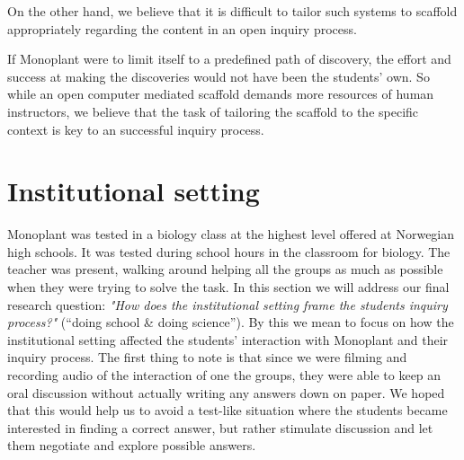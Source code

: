 On the other hand, we believe that it is difficult to tailor such systems to scaffold appropriately regarding the content in an open inquiry process.

 If Monoplant were to limit itself to a predefined path of discovery, the effort and success at making the discoveries would not have been the students' own. So while an open computer mediated scaffold demands more resources of human instructors, we believe that the task of tailoring the scaffold to the specific context is key to an successful inquiry process. 









\section{Institutional setting}
Monoplant was tested in a biology class at the highest level offered at Norwegian high schools. It was tested during school hours in the classroom for biology. The teacher was present, walking around helping all the groups as much as possible when they were trying to solve the task. In this section we will address our final research question: \emph{"How does the institutional setting frame the students inquiry process?"} (“doing school \& doing science”).
By this we mean to focus on how the institutional setting affected the students' interaction with Monoplant and their inquiry process. The first thing to note is that since we were filming and recording audio of the interaction of one the groups, they were able to keep an oral discussion without actually writing any answers down on paper. We hoped that this would help us to avoid a test-like situation where the students became interested in finding a correct answer, but rather stimulate discussion and let them negotiate and explore possible answers.

